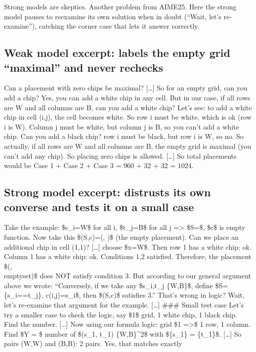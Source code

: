\documentclass[
  10
]{article}
\begin{document}
Strong models are skeptics. Another problem from AIME25. Here the strong
model pauses to reexamine its own solution when in doubt (``Wait, let's
re-examine''), catching the corner case that lets it answer correctly.

\subsection{Weak model excerpt: labels the empty grid ``maximal'' and
never
rechecks}\label{weak-model-excerpt-labels-the-empty-grid-maximal-and-never-rechecks}

Can a placement with zero chips be maximal? {[}\ldots{]} So for an empty
grid, can you add a chip? Yes, you can add a white chip in any cell. But
in our case, if all rows are W and all columns are B, can you add a
white chip? Let's see: to add a white chip in cell (i,j), the cell
becomes white. So row i must be white, which is ok (row i is W). Column
j must be white, but column j is B, so you can't add a white chip. Can
you add a black chip? row i must be black, but row i is W, so no. So
actually, if all rows are W and all columns are B, the empty grid is
maximal (you can't add any chip). So placing zero chips is allowed.
{[}\ldots{]} So total placements would be Case 1 + Case 2 + Case 3 = 960
+ 32 + 32 = 1024.

\subsection{Strong model excerpt: distrusts its own converse and tests
it on a small
case}\label{strong-model-excerpt-distrusts-its-own-converse-and-tests-it-on-a-small-case}

Take the example: \$s\_i=W\$ for all i, \$t\_j=B\$ for all j
=\textgreater{} \$S=\emptyset\$, \$c\$ is empty function. Now take this
\$(S,c)=(\emptyset, \emptyset)\$ (the empty placement). Can we place an
additional chip in cell (1,1)? {[}\ldots{]} choose \$x=W\$. Then row 1
has a white chip: ok. Column 1 has a white chip: ok. Conditions 1,2
satisfied. Therefore, the placement \$(\emptyset,\\
emptyset)\$ does NOT satisfy condition 3. But according to our general
argument above we wrote: ``Conversely, if we take any \$s\_i,t\_j \in
\{W,B\}\$, define \$S=\{s\_i==t\_j\}, c(i,j)=s\_i\$, then \$(S,c)\$
satisfies 3.'' That's wrong in logic? Wait, let's re-examine that
argument for the example. {[}\ldots{]} \#\#\# Small test case Let's try
a smaller case to check the logic, say \$1\$ grid, 1 white chip,
1 black chip. Find the number. {[}\ldots{]} Now using our formula logic:
grid \$1 =\textgreater\$ 1 row, 1 column. Find
\$\textbar Y\textbar{} = \$ number of \$(s\_1, t\_1) \in \{W,B\}\^{}2\$
with \$\{s\_1\} = \{t\_1\}\$. {[}\ldots{]} So pairs (W,W) and (B,B): 2
pairs. Yes, that matches exactly
\end{document}
